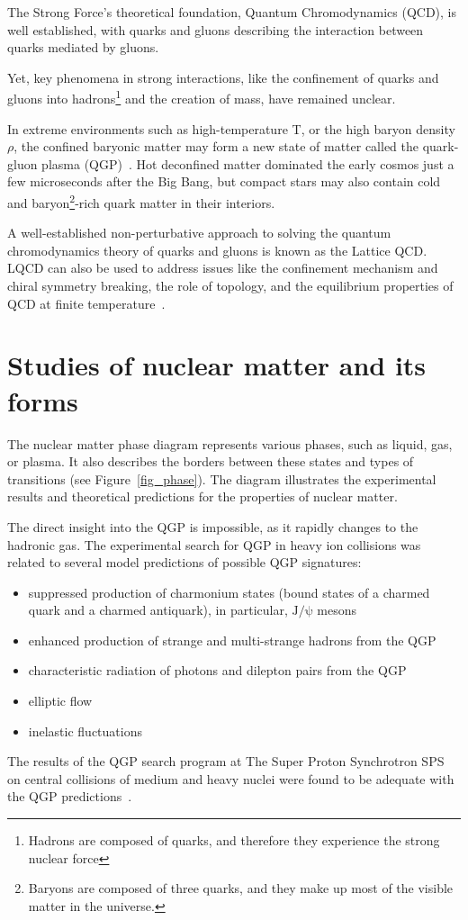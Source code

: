 \newpage

The Strong Force's theoretical foundation, Quantum Chromodynamics (QCD), is well established, with quarks and gluons describing the interaction between quarks mediated by gluons.

Yet, key phenomena in strong interactions, like the confinement of quarks and gluons into hadrons\footnote{Hadrons are composed of quarks, and therefore they experience the strong nuclear force} and the creation of mass, have remained unclear.

In extreme environments such as high-temperature T, or the high baryon density $\rho$, the confined baryonic matter may form a new state of matter called the quark-gluon plasma (\gls{QGP})~\cite{phase_diagram}. Hot deconfined matter dominated the early cosmos just a few microseconds after the Big Bang, but compact stars may also contain cold and baryon\footnote{Baryons are composed of three quarks, and they make up most of the visible matter in the universe.}-rich quark matter in their interiors.

A well-established non-perturbative approach to solving the quantum chromodynamics theory of quarks and gluons is known as the Lattice \gls{QCD}. LQCD can also be used to address issues like the confinement mechanism and chiral symmetry breaking, the role of topology, and the equilibrium properties of \gls{QCD} at finite temperature~\cite{lattice_qcd}. 

\section{Studies of nuclear matter and its forms}
 The nuclear matter phase diagram represents various phases, such as liquid, gas, or plasma. It also describes the borders between these states and types of transitions (see Figure~\ref{fig_phase}). The diagram illustrates the experimental results and theoretical predictions for the properties of nuclear matter.

The direct insight into the \gls{QGP} is impossible, as it rapidly changes to the hadronic gas. The experimental search for \gls{QGP} in heavy ion collisions was related to several model predictions of possible \gls{QGP} signatures: 
\begin{itemize}
    \item suppressed production of charmonium states (bound states of a charmed quark and a charmed antiquark), in particular, $\mathrm{J/\psi}$ mesons \cite{MATSUI1986416}
    \item enhanced production of strange and multi-strange hadrons from the \gls{QGP} \cite{strageness}
    \item characteristic radiation of photons and dilepton pairs from the \gls{QGP}
    \item elliptic flow \cite{Stefaniak:2022dxo}
    \item inelastic fluctuations \cite{Stefaniak:2022dxo}
\end{itemize}
The results of the QGP search program at The Super Proton Synchrotron \gls{SPS} on central collisions of medium and heavy nuclei were found to be adequate with the QGP predictions~\cite{Rafelski_2015}.

